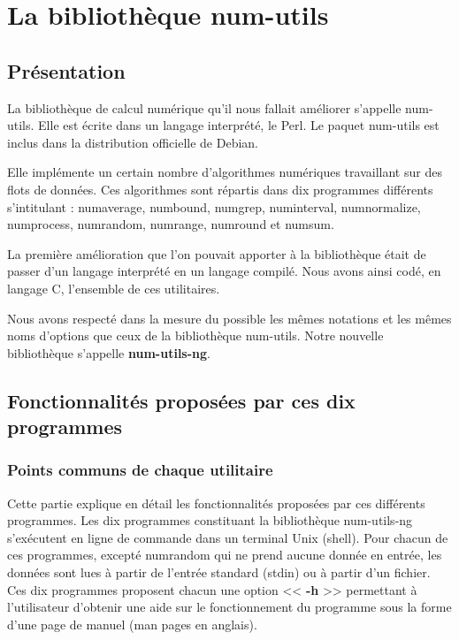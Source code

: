 \chapter{La biblioth\`eque num-utils}
\label{chap:num-utils}

\section{Pr\'esentation}
La biblioth\`eque de calcul num\'erique qu'il nous fallait am\'eliorer s'appelle num-utils. Elle est \'ecrite dans un langage
interpr\'et\'e, le Perl.
Le paquet num-utils est inclus dans la distribution officielle de Debian.

Elle impl\'emente un certain nombre d'algorithmes num\'eriques travaillant sur des flots de donn\'ees.
Ces algorithmes sont r\'epartis dans dix programmes diff\'erents s'intitulant : numaverage, numbound, numgrep, numinterval, numnormalize,
numprocess, numrandom, numrange, numround et numsum.

La premi\`ere am\'elioration que l'on pouvait apporter \`a la biblioth\`eque \'etait de passer d'un langage interpr\'et\'e en un langage compil\'e.
Nous avons ainsi cod\'e, en langage C, l'ensemble de ces utilitaires.

Nous avons respect\'e dans la mesure du possible les m\^emes notations et les m\^emes noms d'options que ceux de la biblioth\`eque num-utils.
Notre nouvelle biblioth\`eque s'appelle \textbf{num-utils-ng}.

\section{Fonctionnalit\'es propos\'ees par ces dix programmes}

\subsection{Points communs de chaque utilitaire}
Cette partie explique en d\'etail les fonctionnalit\'es propos\'ees par ces diff\'erents programmes.
Les dix programmes constituant la biblioth\`eque num-utils-ng s'ex\'ecutent en ligne de commande dans un terminal Unix (shell).
Pour chacun de ces programmes, except\'e numrandom qui ne prend aucune donn\'ee en entr\'ee, les donn\'ees sont lues \`a partir 
de l'entr\'ee standard (stdin) ou \`a partir d'un fichier.
Ces dix programmes proposent chacun une option << \textbf{-h} >> permettant \`a l'utilisateur d'obtenir une aide sur le fonctionnement du 
programme sous la forme d'une page de manuel (man pages en anglais).


